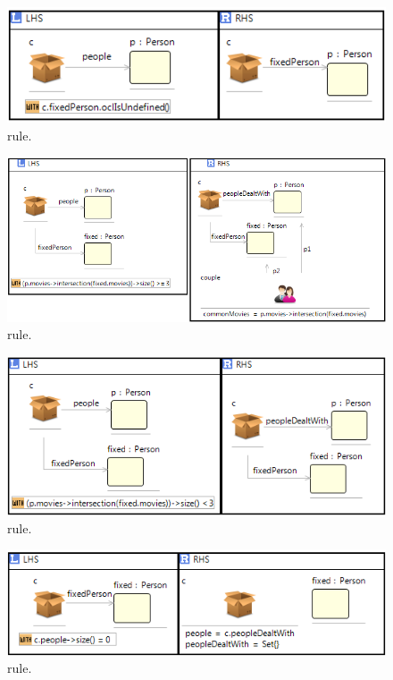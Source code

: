 \begin{figure}[htp]
  \centering
  \includegraphics[width=\textwidth]{imgs/fixPerson}
  \caption{ rule.}\label{fig:fixPerson}
\end{figure}

\begin{figure}[htp]
  \centering
  \includegraphics[width=\textwidth]{imgs/areCouple}
  \caption{ rule.}\label{fig:areCouples}
\end{figure}

\begin{figure}[htp]
  \centering
  \includegraphics[width=\textwidth]{imgs/areNotCouple}
  \caption{ rule.}\label{fig:areNotCouples}
\end{figure}

\begin{figure}[htp]
  \centering
  \includegraphics[width=\textwidth]{imgs/nextPerson}
  \caption{ rule.}\label{fig:nextPerson}
\end{figure}

